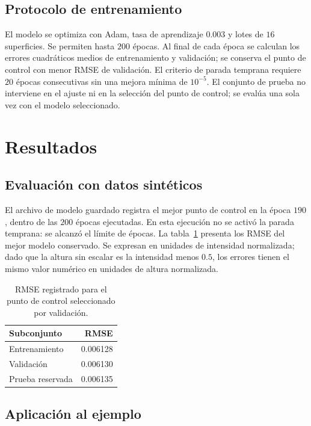\documentclass[12pt,a4paper]{article}
\begin{document}
\subsection{Protocolo de entrenamiento}

El modelo se optimiza con Adam, tasa de aprendizaje \(0.003\) y lotes de \(16\) superficies. Se permiten hasta \(200\) épocas. Al final de cada época se calculan los errores cuadráticos medios de entrenamiento y validación; se conserva el punto de control con menor RMSE de validación. El criterio de parada temprana requiere \(20\) épocas consecutivas sin una mejora mínima de \(10^{-5}\). El conjunto de prueba no interviene en el ajuste ni en la selección del punto de control; se evalúa una sola vez con el modelo seleccionado.

\section{Resultados}

\subsection{Evaluación con datos sintéticos}

El archivo de modelo guardado registra el mejor punto de control en la época \(190\), dentro de las \(200\) épocas ejecutadas. En esta ejecución no se activó la parada temprana: se alcanzó el límite de épocas. La tabla~\ref{tab:rmse} presenta los RMSE del mejor modelo conservado. Se expresan en unidades de intensidad normalizada; dado que la altura sin escalar es la intensidad menos \(0.5\), los errores tienen el mismo valor numérico en unidades de altura normalizada.

\begin{table}[H]
  \centering
  \caption{RMSE registrado para el punto de control seleccionado por validación.}
  \label{tab:rmse}
  \begin{tabular}{lr}
    \hline
    Subconjunto & RMSE \\
    \hline
    Entrenamiento & 0.006128 \\
    Validación & 0.006130 \\
    Prueba reservada & 0.006135 \\
    \hline
  \end{tabular}
\end{table}

\subsection{Aplicación al ejemplo}
\end{document}
